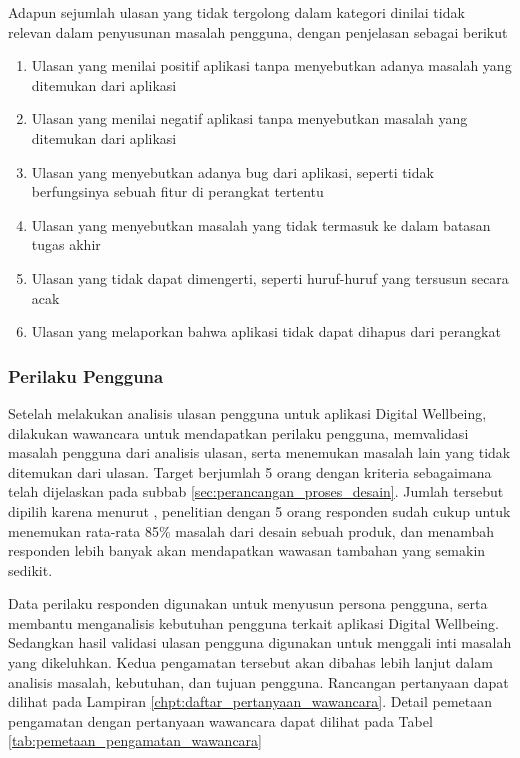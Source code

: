 \FloatBarrier

Adapun sejumlah ulasan yang tidak tergolong dalam kategori dinilai tidak relevan dalam penyusunan masalah pengguna, dengan penjelasan sebagai berikut

\begin{enumerate}
  \item Ulasan yang menilai positif aplikasi tanpa menyebutkan adanya masalah yang ditemukan dari aplikasi
  \item Ulasan yang menilai negatif aplikasi tanpa menyebutkan masalah yang ditemukan dari aplikasi
  \item Ulasan yang menyebutkan adanya bug dari aplikasi, seperti tidak berfungsinya sebuah fitur di perangkat tertentu
  \item Ulasan yang menyebutkan masalah yang tidak termasuk ke dalam batasan tugas akhir
  \item Ulasan yang tidak dapat dimengerti, seperti huruf-huruf yang tersusun secara acak 
  \item Ulasan yang melaporkan bahwa aplikasi tidak dapat dihapus dari perangkat
\end{enumerate}

\subsubsection{Perilaku Pengguna}
Setelah melakukan analisis ulasan pengguna untuk aplikasi Digital Wellbeing, dilakukan wawancara untuk mendapatkan perilaku pengguna, memvalidasi masalah pengguna dari analisis ulasan, serta menemukan masalah lain yang tidak ditemukan dari ulasan. Target berjumlah 5 orang dengan kriteria sebagaimana telah dijelaskan pada subbab \ref{sec:perancangan_proses_desain}. Jumlah tersebut dipilih karena menurut \textcite{nielsenusabilityproblems}, penelitian dengan 5 orang responden sudah cukup untuk menemukan rata-rata 85\% masalah dari desain sebuah produk, dan menambah responden lebih banyak akan mendapatkan wawasan tambahan yang semakin sedikit.

 Data perilaku responden digunakan untuk menyusun persona pengguna, serta membantu menganalisis kebutuhan pengguna terkait aplikasi Digital Wellbeing. Sedangkan hasil validasi ulasan pengguna digunakan untuk  menggali inti masalah yang dikeluhkan. Kedua pengamatan tersebut akan dibahas lebih lanjut dalam analisis masalah, kebutuhan, dan tujuan pengguna. Rancangan pertanyaan dapat dilihat pada Lampiran \ref{chpt:daftar_pertanyaan_wawancara}. Detail pemetaan pengamatan dengan pertanyaan wawancara dapat dilihat pada Tabel \ref{tab:pemetaan_pengamatan_wawancara}

